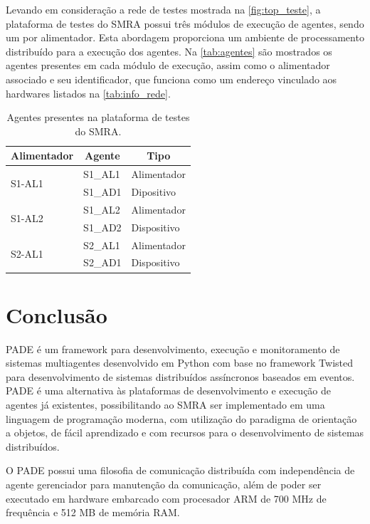 \documentclass[journal]{IEEEtran}
\begin{document}
Levando em consideração a rede de testes mostrada na \autoref{fig:top_teste}, a plataforma de testes do SMRA possui três módulos de execução de agentes, sendo um por alimentador. Esta abordagem proporciona um ambiente de processamento distribuído para a execução dos agentes. Na \autoref{tab:agentes} são mostrados os agentes presentes em cada módulo de execução, assim como o alimentador associado e seu identificador, que funciona como um endereço vinculado aos hardwares listados na \autoref{tab:info_rede}.

\begin{table}[htb]
    \centering
    \caption{\label{tab:agentes} Agentes presentes na plataforma de testes do SMRA.}
    \begin{tabular}{p{0.8in}p{0.5in}p{1.0in}}
        \toprule
         \multicolumn{1}{c}{Alimentador} & \multicolumn{1}{c}{Agente} & \multicolumn{1}{c}{Tipo} \\[0.1in]
        \midrule
        \midrule
        \multirow{2}{1.0in}{S1-AL1} & S1\_AL1 & Alimentador \\
        & S1\_AD1 & Dipositivo \\
        \midrule
        \multirow{2}{1.0in}{S1-AL2} & S1\_AL2 & Alimentador \\
        & S1\_AD2 & Dispositivo \\
        \midrule
        \multirow{2}{1.0in}{S2-AL1} & S2\_AL1 & Alimentador \\
        & S2\_AD1 & Dispositivo \\
        \bottomrule
    \end{tabular}
\end{table}

\section{Conclusão}

PADE é um framework para desenvolvimento, execução e monitoramento de sistemas multiagentes desenvolvido em Python com base no framework Twisted para desenvolvimento de sistemas distribuídos assíncronos baseados em eventos. PADE é uma alternativa às plataformas de desenvolvimento e execução de agentes já existentes, possibilitando ao SMRA ser implementado em uma linguagem de programação moderna, com utilização do paradigma de orientação a objetos, de fácil aprendizado e com recursos para o desenvolvimento de sistemas distribuídos.

O PADE possui uma filosofia de comunicação distribuída com independência de agente gerenciador para manutenção da comunicação, além de poder ser executado em hardware embarcado com procesador ARM de 700 MHz de frequência e 512 MB de memória RAM. 
\end{document}
